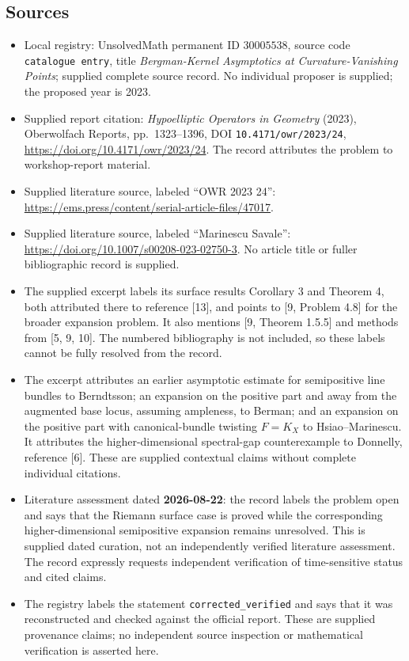 \documentclass[11pt]{article}
\begin{document}
\subsection{Sources}
\begin{itemize}
\item Local registry: UnsolvedMath permanent ID \(30005538\), source code \texttt{catalogue entry}, title \emph{Bergman-Kernel Asymptotics at Curvature-Vanishing Points}; supplied complete source record. No individual proposer is supplied; the proposed year is 2023.
\item Supplied report citation: \emph{Hypoelliptic Operators in Geometry} (2023), Oberwolfach Reports, pp.\ 1323--1396, DOI \texttt{10.4171/owr/2023/24}, \url{https://doi.org/10.4171/owr/2023/24}. The record attributes the problem to workshop-report material.
\item Supplied literature source, labeled ``OWR 2023 24'': \url{https://ems.press/content/serial-article-files/47017}.
\item Supplied literature source, labeled ``Marinescu Savale'': \url{https://doi.org/10.1007/s00208-023-02750-3}. No article title or fuller bibliographic record is supplied.
\item The supplied excerpt labels its surface results Corollary 3 and Theorem 4, both attributed there to reference [13], and points to [9, Problem 4.8] for the broader expansion problem. It also mentions [9, Theorem 1.5.5] and methods from [5, 9, 10]. The numbered bibliography is not included, so these labels cannot be fully resolved from the record.
\item The excerpt attributes an earlier asymptotic estimate for semipositive line bundles to Berndtsson; an expansion on the positive part and away from the augmented base locus, assuming ampleness, to Berman; and an expansion on the positive part with canonical-bundle twisting \(F=K_X\) to Hsiao--Marinescu. It attributes the higher-dimensional spectral-gap counterexample to Donnelly, reference [6]. These are supplied contextual claims without complete individual citations.
\item Literature assessment dated \textbf{2026-08-22}: the record labels the problem open and says that the Riemann surface case is proved while the corresponding higher-dimensional semipositive expansion remains unresolved. This is supplied dated curation, not an independently verified literature assessment. The record expressly requests independent verification of time-sensitive status and cited claims.
\item The registry labels the statement \texttt{corrected\_verified} and says that it was reconstructed and checked against the official report. These are supplied provenance claims; no independent source inspection or mathematical verification is asserted here.
\end{itemize}
\end{document}
